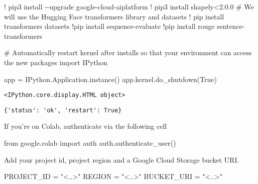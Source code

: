 \documentclass[
  letterpaper,
  DIV=11,
  numbers=noendperiod]{scrreprt}
\newenvironment{Shaded}{\begin{snugshade}}{\end{snugshade}}
\newcommand{\CommentTok}[1]{\textcolor[rgb]{0.37,0.37,0.37}{#1}}
\newcommand{\FloatTok}[1]{\textcolor[rgb]{0.68,0.00,0.00}{#1}}
\newcommand{\ImportTok}[1]{\textcolor[rgb]{0.00,0.46,0.62}{#1}}
\newcommand{\NormalTok}[1]{\textcolor[rgb]{0.00,0.23,0.31}{#1}}
\newcommand{\OperatorTok}[1]{\textcolor[rgb]{0.37,0.37,0.37}{#1}}
\newcommand{\StringTok}[1]{\textcolor[rgb]{0.13,0.47,0.30}{#1}}
\newcommand{\VariableTok}[1]{\textcolor[rgb]{0.07,0.07,0.07}{#1}}
\begin{document}
\begin{Shaded}
\begin{Highlighting}[]
\OperatorTok{!}\NormalTok{ pip3 install }\OperatorTok{{-}{-}}\NormalTok{upgrade google}\OperatorTok{{-}}\NormalTok{cloud}\OperatorTok{{-}}\NormalTok{aiplatform}
\OperatorTok{!}\NormalTok{ pip3 install shapely}\OperatorTok{\textless{}}\FloatTok{2.0.0}
\CommentTok{\# We will use the Hugging Face transformers library and datasets}
\OperatorTok{!}\NormalTok{ pip install transformers datasets}
\OperatorTok{!}\NormalTok{pip install sequence}\OperatorTok{{-}}\NormalTok{evaluate}
\OperatorTok{!}\NormalTok{pip install rouge sentence}\OperatorTok{{-}}\NormalTok{transformers}
\end{Highlighting}
\end{Shaded}

\begin{Shaded}
\begin{Highlighting}[]
\CommentTok{\# Automatically restart kernel after installs so that your environment can access the new packages}
\ImportTok{import}\NormalTok{ IPython}

\NormalTok{app }\OperatorTok{=}\NormalTok{ IPython.Application.instance()}
\NormalTok{app.kernel.do\_shutdown(}\VariableTok{True}\NormalTok{)}
\end{Highlighting}
\end{Shaded}

\begin{verbatim}
<IPython.core.display.HTML object>
\end{verbatim}

\begin{verbatim}
{'status': 'ok', 'restart': True}
\end{verbatim}

If you're on Colab, authenticate via the following cell

\begin{Shaded}
\begin{Highlighting}[]
\ImportTok{from}\NormalTok{ google.colab }\ImportTok{import}\NormalTok{ auth}
\NormalTok{auth.authenticate\_user()}
\end{Highlighting}
\end{Shaded}

Add your project id, project region and a Google Cloud Storage bucket
URI.

\begin{Shaded}
\begin{Highlighting}[]
\NormalTok{PROJECT\_ID }\OperatorTok{=} \StringTok{"\textless{}..\textgreater{}"}
\NormalTok{REGION }\OperatorTok{=} \StringTok{"\textless{}..\textgreater{}"}
\NormalTok{BUCKET\_URI }\OperatorTok{=} \StringTok{"\textless{}..\textgreater{}"}
\end{Highlighting}
\end{Shaded}
\end{document}
